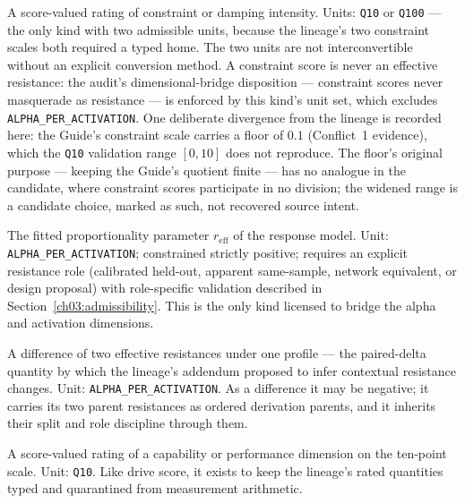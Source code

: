 \begin{definition}\label{ch03:qk:constraint}
A score-valued rating of constraint or damping intensity. Units: \texttt{Q10} or \texttt{Q100} --- the only kind with two admissible units, because the lineage's two constraint scales both required a typed home. The two units are not interconvertible without an explicit conversion method. A constraint score is never an effective resistance: the audit's dimensional-bridge disposition --- constraint scores never masquerade as resistance --- is enforced by this kind's unit set, which excludes \texttt{ALPHA\_PER\_ACTIVATION}. One deliberate divergence from the lineage is recorded here: the Guide's constraint scale carries a floor of $0.1$ (Conflict~1 evidence), which the \texttt{Q10} validation range $[0,10]$ does not reproduce. The floor's original purpose --- keeping the Guide's quotient finite --- has no analogue in the candidate, where constraint scores participate in no division; the widened range is a candidate choice, marked as such, not recovered source intent.
\end{definition}

\begin{definition}\label{ch03:qk:reff}
The fitted proportionality parameter $r_{\mathrm{eff}}$ of the response model. Unit: \texttt{ALPHA\_PER\_ACTIVATION}; constrained strictly positive; requires an explicit resistance role (calibrated held-out, apparent same-sample, network equivalent, or design proposal) with role-specific validation described in Section~\ref{ch03:admissibility}. This is the only kind licensed to bridge the alpha and activation dimensions.
\end{definition}

\begin{definition}\label{ch03:qk:rdelta}
A difference of two effective resistances under one profile --- the paired-delta quantity by which the lineage's addendum proposed to infer contextual resistance changes. Unit: \texttt{ALPHA\_PER\_ACTIVATION}. As a difference it may be negative; it carries its two parent resistances as ordered derivation parents, and it inherits their split and role discipline through them.
\end{definition}

\begin{definition}\label{ch03:qk:capscore}
A score-valued rating of a capability or performance dimension on the ten-point scale. Unit: \texttt{Q10}. Like drive score, it exists to keep the lineage's rated quantities typed and quarantined from measurement arithmetic.
\end{definition}

